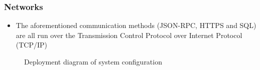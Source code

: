 \documentclass{article}
\begin{document}
\subsubsection*{Networks}
\begin{itemize}
\item The aforementioned communication methods (JSON-RPC, HTTPS and SQL) are all run over the Transmission Control Protocol over Internet Protocol (TCP/IP) 
\end{itemize}


\begin{figure}[h]
\centering
{}
\caption{Deployment diagram of system configuration}
\end{figure}
\end{document}

